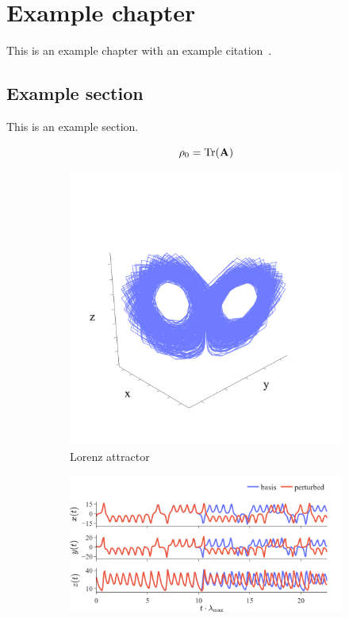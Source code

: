 \chapter{Example chapter}
This is an example chapter with an example citation~\cite{tikhonov1977solutions}.


\section{Example section}
This is an example section.

\begin{equation}
    \rho_0 = \operatorname{Tr}(\mathbf{A})
\end{equation}

\begin{figure}[htp]
    \begin{subfigure}[b]{.38\textwidth}
        \centering
        \includegraphics[width=.99\linewidth]{./figures/02_ExampleChapter/perturbed_vs_true_lorenz_traj}
        \caption{Lorenz attractor}
        \label{fig:lorenz-trajectory-basis-vs-pert}
    \end{subfigure}
    \begin{subfigure}[b]{.61\textwidth}
        \centering
        \includegraphics[width=.99\linewidth]{./figures/02_ExampleChapter/perturbed_vs_true_lorenz_1dim_all}

\end{subfigure}
\end{figure}
